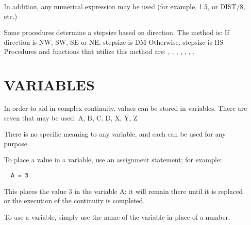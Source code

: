 In addition, any numerical expression may be used (for example, 1.5, or
DIST/8, etc.)

Some procedures determine a stepsize based on direction.  The method is:
  If direction is NW, SW, SE or NE, stepsize is DM
  Otherwise,                        stepsize is HS
Procedures and functions that utilize this method are:
  , ,
, ,
, , ,

\section{VARIABLES}\label{variables}

In order to aid in complex continuity, values can be stored in variables.
There are seven that may be used:
  A, B, C, D, X, Y, Z

There is no specific meaning to any variable, and each can be used for any
purpose.

To place a value in a variable, use an assignment statement; for example:
\begin{verbatim}
  A = 3
\end{verbatim}
This places the value 3 in the variable A; it will remain there until it is
replaced or the execution of the continuity is completed.

To use a variable, simply use the name of the variable in place of a number.

